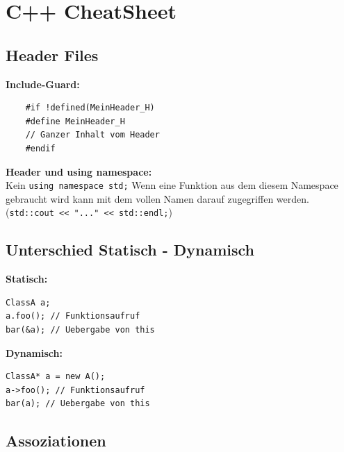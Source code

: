 \section{C++ CheatSheet}

\subsection{Header Files}
\begin{multicols}{2}
	\textbf{Include-Guard:}
	\begin{lstlisting}
	#if !defined(MeinHeader_H)
	#define MeinHeader_H
	// Ganzer Inhalt vom Header
	#endif
	\end{lstlisting}
	
	\textbf{Header und using namespace:} \\
	Kein \lstinline!using namespace std;! Wenn eine Funktion aus
	dem diesem Namespace gebraucht wird kann mit dem vollen Namen darauf
	zugegriffen werden. (\lstinline!std::cout << "..." << std::endl;!)
\end{multicols}


\subsection{Unterschied Statisch - Dynamisch}
\begin{multicols}{2}
\textbf{Statisch:}
\begin{lstlisting}
ClassA a;
a.foo(); // Funktionsaufruf
bar(&a); // Uebergabe von this
\end{lstlisting}

\textbf{Dynamisch:} 
\begin{lstlisting}
ClassA* a = new A();
a->foo(); // Funktionsaufruf
bar(a); // Uebergabe von this
\end{lstlisting}
\end{multicols}

\subsection{Assoziationen}

